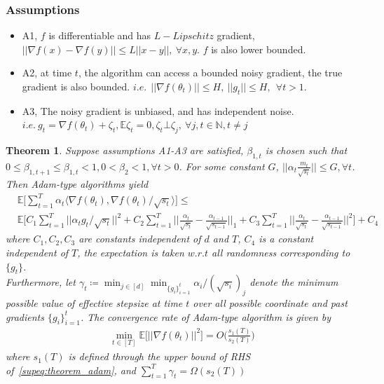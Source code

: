 \documentclass{article}
\newtheorem{theorem}{Theorem}[section]
\begin{document}
\subsubsection*{Assumptions}
\begin{itemize}
    \item A1, $f$ is differentiable and has $L-Lipschitz$ gradient, $ \vert  \vert \nabla f(x) - \nabla f(y)  \vert  \vert \leq L  \vert  \vert x-y  \vert  \vert,\ \forall x,y$. $f$ is also lower bounded.
    \item A2, at time $t$, the algorithm can access a bounded noisy gradient, the true gradient is also bounded. $i.e.\ \  \vert  \vert \nabla f(\theta_t ) \vert  \vert \leq H,\  \vert  \vert g_t \vert  \vert \leq H,\ \ \forall t > 1$.
    \item A3, The noisy gradient is unbiased, and has independent noise. $i.e.\ g_t = \nabla f(\theta_t ) + \zeta_t, \mathbb{E} \zeta_t = 0, \zeta_t \bot \zeta_j, \ \forall j,t \in \mathbb{N}, t \neq j$
\end{itemize}
\begin{theorem} \cite{chen2018convergence}
\label{suptheorem:adam_type}
Suppose assumptions A1-A3 are satisfied, $\beta_{1,t}$ is chosen such that $0 \leq \beta_{1,t+1} \leq \beta_{1,t} < 1, 0 < \beta_2 < 1,  \forall t>0$. For some constant $G$, $\Big \vert \Big \vert \alpha_t \frac{m_t}{\sqrt{s_t}} \Big \vert \Big \vert \leq G, \forall t$. Then Adam-type algorithms yield 
\begin{align}
\label{supeq:theorem_adam}
&\mathbb{E} \Big[ \sum_{t=1}^T \alpha_t \langle \nabla f(\theta_t), \nabla f(\theta_t) / \sqrt{s_t} \rangle \Big] \leq \nonumber \\ &\mathbb{E} \Bigg[ C_1 \sum_{t=1}^T \Big \vert \Big \vert \alpha_t g_t/ \sqrt{s_t} \Big \vert \Big \vert^2 
    + C_2 \sum_{t=1}^T \Bigg \vert \Bigg \vert \frac{\alpha_t}{\sqrt{s_t}} - \frac{\alpha_{t-1}}{ \sqrt{ s_{t-1}}} \Bigg \vert \Bigg \vert_1 + C_3 \sum_{t=1}^T \Bigg \vert \Bigg \vert \frac{\alpha_t}{\sqrt{s_t}} - \frac{\alpha_{t-1}}{\sqrt{s_{t-1}}} \Bigg \vert \Bigg \vert^2 \Bigg] + C_4
\end{align}
where $C_1, C_2, C_3$ are constants independent of $d$ and $T$, $C_4$ is a constant independent of $T$, the expectation is taken $w.r.t$ all randomness corresponding to $\{g_t\}$. \\
Furthermore, let $\gamma_t \coloneqq \operatorname*{min}_{j \in [d]} \operatorname*{min}_{\{g_i\}_{i=1}^t} \alpha_i / (\sqrt{s_i})_j$ denote the minimum possible value of effective stepsize at time $t$ over all possible coordinate and past gradients $\{g_i\}_{i=1}^t$. The convergence rate of Adam-type algorithm is given by 
\begin{align}
\label{supeq:theorem_adam2}
    \operatorname{min}_{t \in [T]} \mathbb{E} \Bigg[ \Big \vert \Big \vert \nabla f(\theta_t ) \Big \vert \Big \vert^2 \Bigg] = O \Bigg(\frac{s_1(T)}{s_2(T)} \Bigg)
\end{align}
where $s_1(T)$ is defined through the upper bound of RHS of~\eqref{supeq:theorem_adam}, and $\sum_{t=1}^T \gamma_t = \Omega (s_2(T))$
\end{theorem}
\end{document}
